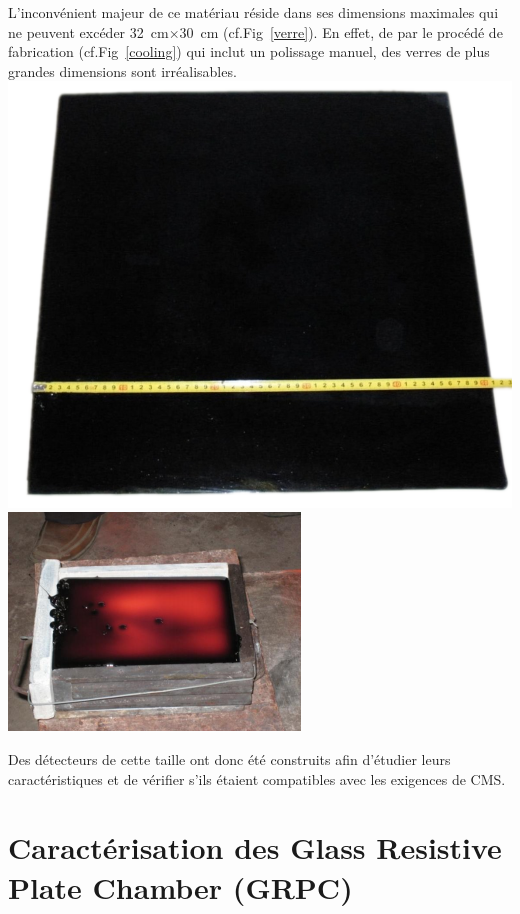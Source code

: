 L'inconvénient majeur de ce matériau réside dans ses dimensions maximales qui ne peuvent excéder \SI{32}{\centi\meter}$\times$\SI{30}{\centi\meter} (cf.Fig~\ref{verre}). En effet, de par le procédé de fabrication (cf.Fig~\ref{cooling}) qui inclut un polissage manuel, des verres de plus grandes dimensions sont irréalisables.
\marginpar
{
	\centering
	\includegraphics[width=\marginparwidth]{GLA/verre.png}
	\label{verre}
}
\marginpar
{
	\centering
	\includegraphics[width=\marginparwidth]{GLA/cooling.png}
	\label{cooling}
}

Des détecteurs de cette taille ont donc été construits afin d'étudier leurs caractéristiques et de vérifier s'ils étaient compatibles avec les exigences de CMS.

\section{Caractérisation des Glass Resistive Plate Chamber (GRPC)}
 
